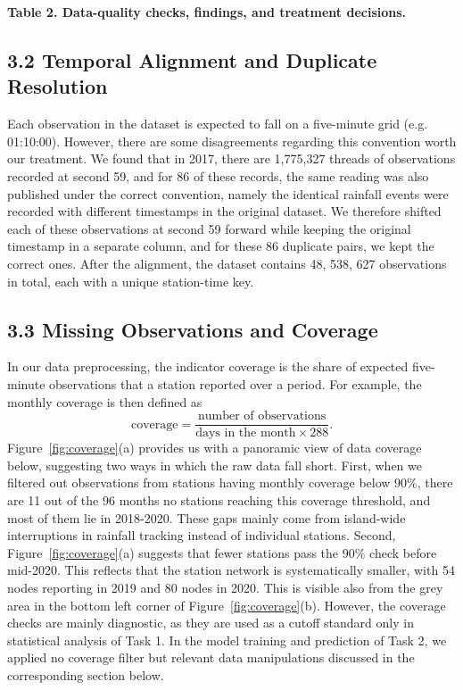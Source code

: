 \documentclass[11pt,a4paper]{article}
\begin{document}
\textbf{Table 2. Data-quality checks, findings, and treatment decisions.}


\subsection*{3.2 Temporal Alignment and Duplicate Resolution}
{}


Each observation in the dataset is expected to fall on a five-minute grid (e.g. 01:10:00). However, there are some disagreements regarding this convention worth our treatment. We found that in 2017, there are 1,775,327 threads of observations recorded at second 59, and for 86 of these records, the same reading was also published under the correct convention, namely the identical rainfall events were recorded with different timestamps in the original dataset. We therefore shifted each of these observations at second 59 forward while keeping the original timestamp in a separate column, and for these 86 duplicate pairs, we kept the correct ones. After the alignment, the dataset contains 48, 538, 627 observations in total, each with a unique station-time key.


\subsection*{3.3 Missing Observations and Coverage}
{}


In our data preprocessing, the indicator coverage is the share of expected five-minute observations that a station reported over a period. For example, the monthly coverage is then defined as 
\[
\mathrm{coverage}=\frac{\text{number of observations}}{\text{days in the month}\times288}.
\]
Figure~\ref{fig:coverage}(a) provides us with a panoramic view of data coverage below, suggesting two ways in which the raw data fall short. First, when we filtered out observations from stations having monthly coverage below \(90\%\), there are 11 out of the 96 months no stations reaching this coverage threshold, and most of them lie in 2018-2020. These gaps mainly come from island-wide interruptions in rainfall tracking instead of individual stations. Second, Figure~\ref{fig:coverage}(a) suggests that fewer stations pass the \(90\%\) check before mid-2020. This reflects that the station network is systematically smaller, with 54 nodes reporting in 2019 and 80 nodes in 2020. This is visible also from the grey area in the bottom left corner of Figure~\ref{fig:coverage}(b). However, the coverage checks are mainly diagnostic, as they are used as a cutoff standard only in statistical analysis of Task 1. In the model training and prediction of Task 2, we applied no coverage filter but relevant data manipulations discussed in the corresponding section below.
\end{document}
